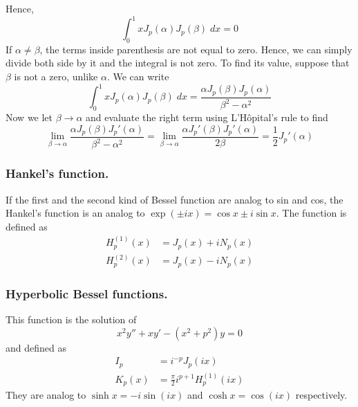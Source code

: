 \documentclass[../../../main.tex]{subfiles}
\begin{document}
Hence,
\begin{equation*}
    \int_{0}^{1}xJ_p(\alpha)J_p(\beta)\;dx=0
\end{equation*}
If $\alpha\neq\beta$, the terms inside parenthesis are not equal to zero.
Hence, we can simply divide both side by it and the integral is not zero.
To find its value, suppose that $\beta$ is not a zero, unlike $\alpha$.
We can write
\begin{equation*}
    \int_{0}^{1}xJ_p(\alpha)J_p(\beta)\;dx=\frac{\alpha J_p(\beta)J_p(\alpha)}{\beta^2-\alpha^2}
\end{equation*}
Now we let $\beta\rightarrow\alpha$ and evaluate the right term using  L'Hôpital's rule to find
\begin{equation*}
    \lim_{\beta\rightarrow\alpha}\frac{\alpha J_p(\beta)J_p'(\alpha)}{\beta^2-\alpha^2} =\lim_{\beta\rightarrow\alpha}\frac{\alpha J_p'(\beta)J_p'(\alpha)}{2\beta}=\frac{1}{2}J_p'(\alpha)
\end{equation*}


\subsubsection{Hankel's function.} If the first and the second kind of Bessel function are analog to sin and cos, the Hankel's function is an analog to $\exp(\pm ix)=\cos x \pm i\sin x$.
The function is defined as
\begin{align*}
    H_p^{(1)}(x) & =J_p(x)+iN_p(x) \\
    H_p^{(2)}(x) & =J_p(x)-iN_p(x)
\end{align*}

\subsubsection{Hyperbolic Bessel functions.} This function is the solution of
\begin{equation*}
    x^2y''+xy'-(x^2+p^2)y=0
\end{equation*}
and defined as
\begin{align*}
    I_p    & =i^{-p}J_p(ix)                     \\
    K_p(x) & =\frac{\pi}{2}i^{p+1}H_p^{(1)}(ix)
\end{align*}
They are analog to $\sinh x= -i\sin (ix)$ and $\cosh x=\cos (ix)$ respectively.
\end{document}
